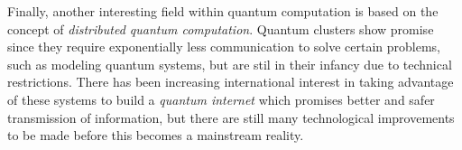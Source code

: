 \documentclass[../../dissertation.tex]{subfiles}
\begin{document}
Finally, another interesting field within quantum computation is based on the
concept of \textit{distributed quantum computation}. Quantum clusters show
promise since they require exponentially less communication to solve certain
problems, such as modeling quantum systems, but are stil in their infancy due
to technical restrictions. There has been increasing international interest in
taking advantage of these systems to build a \textit{quantum internet} which
promises better and safer transmission of information, but there are still many
technological improvements to be made before this becomes a mainstream reality. 
\end{document}
